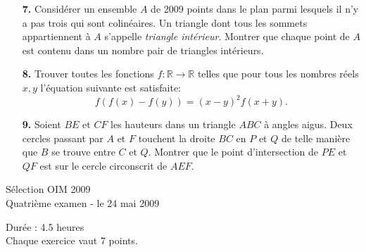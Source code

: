 \documentclass[12pt,a4paper]{article}
\newcommand{\BR}{{\mathbb{R}}}
\theoremstyle{plain}
\theoremstyle{definition}
\theoremstyle{remark}
\begin{document}
\begin{enumerate}
\item[\textbf{7.}] Consid\'erer un ensemble $A$ de 2009 points dans le plan parmi lesquels il n'y a pas trois qui sont colin\'eaires. Un triangle dont tous les sommets appartiennent \`a $A$ s'appelle \emph{triangle int\'erieur}. Montrer que chaque point de $A$ est contenu dans un nombre pair de triangles int\'erieurs.\\


\bigskip
\bigskip


\item[\textbf{8.}] Trouver toutes les fonctions $f:\BR \rightarrow \BR$ telles que pour tous les nombres r\'eels $x,y$ l'\'equation suivante est satisfaite:
\[f(f(x)-f(y))=(x-y)^2f(x+y).\]



\bigskip
\bigskip

\item[\textbf{9.}] Soient $BE$ et $CF$ les hauteurs dans un triangle $ABC$ \`a angles aigus.
Deux cercles passant par $A$ et $F$ touchent la droite $BC$ en $P$ et $Q$ de telle mani\`ere que $B$ se trouve entre $C$ et $Q$. Montrer que le point d'intersection de $PE$ et $QF$ est sur le cercle circonscrit de $AEF$.


\end{enumerate}


\pagebreak


\begin{center}
{\huge S\'election OIM 2009} \\
\medskip Quatri\`eme examen - le 24 mai 2009
\end{center}
\vspace{8mm}
Dur\'ee : 4.5 heures\\
Chaque exercice vaut 7 points.

\vspace{15mm}
\end{document}
